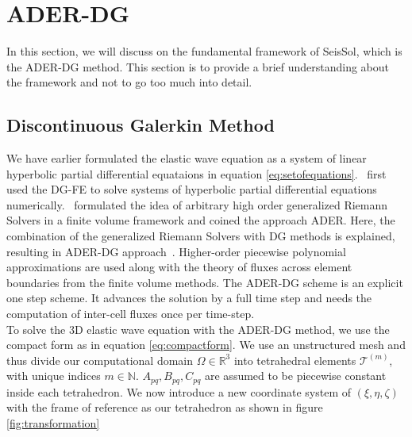 \section{\ac{ADER}-\ac{DG}}\label{section:ADER-DG}

In this section, we will discuss on the fundamental framework of SeisSol, which is the \ac{ADER}-\ac{DG} method. This section is to provide
a brief understanding about the framework and not to go too much into detail. 


\subsection[Discontinuous Galerkin method]{Discontinuous Galerkin Method}\label{subsection:DG}

We have earlier formulated the elastic wave equation as a system of linear hyperbolic partial differential equataions in equation \ref{eq:setofequations}.~\parencite{osti_4491151}
first used the \ac{DG-FE} to solve systems of hyperbolic partial differential equations numerically.~\parencite{Toro2001} formulated the idea of arbitrary high order generalized
Riemann Solvers in a finite volume framework and coined the approach \ac{ADER}. Here, the combination of the generalized Riemann Solvers with \ac{DG}
methods is explained, resulting in \ac{ADER}-\ac{DG} approach~\parencite{Dumbser2006}. Higher-order piecewise polynomial approximations are used
along with the theory of fluxes across element boundaries from the finite volume methods. The \ac{ADER}-\ac{DG} scheme is an explicit one step scheme.
It advances the solution by a full time step and needs the computation of inter-cell fluxes once per time-step. \\

To solve the 3D elastic wave equation with the \ac{ADER}-\ac{DG} method, we use the compact form as in equation \ref{eq:compactform}.
We use an unstructured mesh and thus divide our computational domain $\Omega \in \mathbb{R}^3$ into tetrahedral elements 
$\mathcal{T}^{\left(m\right)}$, with unique indices $m\in\mathbb{N}$. $A_{pq}, B_{pq}, C_{pq}$ are assumed to be piecewise constant
inside each tetrahedron. We now introduce a new coordinate system of $\left(\xi, \eta, \zeta \right)$ with the frame of reference as our tetrahedron as shown 
in figure \ref{fig:transformation} \\

